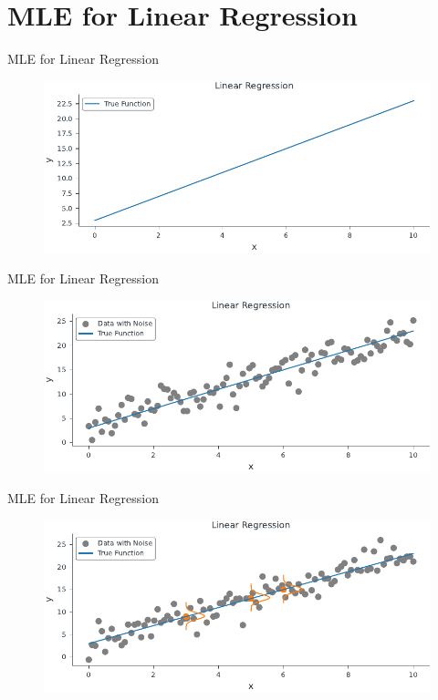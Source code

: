 \documentclass[handout]{beamer}
\begin{document}
\section{MLE for Linear Regression}
\begin{frame}{MLE for Linear Regression}
\begin{figure}
                \centerline{\includegraphics[scale=0.8]{../figures/mle/true_function_lin_reg.pdf}}
\end{figure}
\end{frame}
\begin{frame}{MLE for Linear Regression}
\begin{figure}
                \centerline{\includegraphics[scale=0.8]{../figures/mle/true_function_noise_lin_reg.pdf}}
\end{figure}
\end{frame}
\begin{frame}{MLE for Linear Regression}
\begin{figure}
                \centerline{\includegraphics[scale=0.8]{../figures/mle/true_function_noise_normal_lin_reg.pdf}}
\end{figure}
\end{frame}
\end{document}
